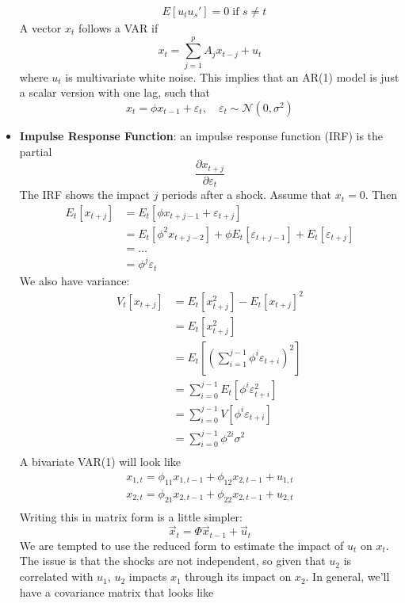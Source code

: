 \documentclass[12pt]{article}
\begin{document}
\begin{itemize}
\[\begin{split}
        &E[u_tu_s'] = 0\; \text{if $s\neq t$}
    \end{split}\]
    A vector $x_t$ follows a VAR if 
    \[x_t = \sum_{j=1}^pA_jx_{t-j} + u_t\]
    where $u_t$ is multivariate white noise. This implies that an AR(1) model is just a scalar version with one lag, such that
    \[x_t = \phi x_{t-1} + \varepsilon_t,\quad \varepsilon_t \sim \mathcal{N}(0,\sigma^2)\]
    \item \textbf{Impulse Response Function}: an impulse response function (IRF) is the partial
    \[\frac{\partial x_{t+j}}{\partial \varepsilon_t}\]
    The IRF shows the impact $j$ periods after a shock. Assume that $x_t = 0$. Then 
    \[\begin{split}
        E_t[x_{t+j}] &= E_t[\phi x_{t+j-1} + \varepsilon_{t+j}] \\
        &= E_t[\phi^2x_{t+j-2}] + \phi E_t[\varepsilon_{t+j-1}] + E_t[\varepsilon_{t+j}]\\
        &= \hdots \\
        &= \phi^j\varepsilon_t
    \end{split}\]
    We also have variance:
    \[\begin{split}
        V_t[x_{t+j}] &= E_t[x_{t+j}^2] - E_t[x_{t+j}]^2 \\
        &= E_t[x_{t+j}^2] \\
        &= E_t\left[\left(\sum_{i=1}^{j-1}\phi^i\varepsilon_{t+i}\right)^2\right] \\
        &= \sum_{i=0}^{j-1}E_t\left[\phi^i\varepsilon_{t+i}^2\right] \\
        &= \sum_{i=0}^{j-1}V\left[\phi^i\varepsilon_{t+i}\right] \\
        &= \sum_{i=0}^{j-1}\phi^{2i}\sigma^2 \\
    \end{split}\]
    A bivariate VAR(1) will look like
    \[\begin{split}
        x_{1,t} = \phi_{11}x_{1,t-1} + \phi_{12}x_{2,t-1} + u_{1,t} \\
        x_{2,t} = \phi_{21}x_{2,t-1} + \phi_{22}x_{2,t-1} + u_{2,t} \\
    \end{split}\]
    Writing this in matrix form is a little simpler:
    \[\vec{x}_t = \Phi \vec{x}_{t-1} + \vec{u}_t\]
    We are tempted to use the reduced form to estimate the impact of $u_t$ on $x_t$. The issue is that the shocks are not independent, so given that $u_2$ is correlated with $u_1$, $u_2$ impacts $x_1$ through its impact on $x_2$. In general, we'll have a covariance matrix that looks like

\end{itemize}
\end{document}
